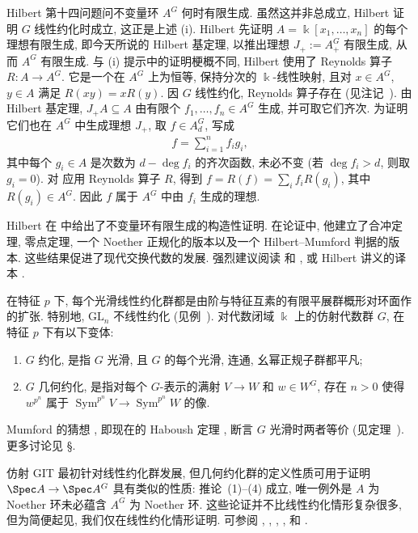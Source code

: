 \begin{remark}\label{src:7.5.2}
Hilbert 第十四问题问不变量环 $A^G$ 何时有限生成. 虽然这并非总成立, Hilbert 证明 $G$ 线性约化时成立, 这正是上述 (i). Hilbert 先证明 $A=\Bbbk[x_1,\ldots,x_n]$ 的每个理想有限生成, 即今天所说的 Hilbert 基定理, 以推出理想 $J_+:=A_+^G$ 有限生成, 从而 $A^G$ 有限生成. 与 (i) 提示中的证明梗概不同, Hilbert 使用了 Reynolds 算子 $R:A\to A^G$. 它是一个在 $A^G$ 上为恒等, 保持分次的 $\Bbbk$-线性映射, 且对 $x\in A^G$, $y\in A$ 满足 $R(xy)=xR(y)$. 因 $G$ 线性约化, Reynolds 算子存在 (见注记~). 由 Hilbert 基定理, $J_+A\subseteq A$ 由有限个 $f_1,\ldots,f_n\in A^G$ 生成, 并可取它们齐次. 为证明它们也在 $A^G$ 中生成理想 $J_+$, 取 $f\in A_d^G$, 写成
\begin{align}\label{src:7.5.3}
f=\sum_{i=1}^n f_i g_i,
\end{align}
其中每个 $g_i\in A$ 是次数为 $d-\deg f_i$ 的齐次函数, 未必不变 (若 $\deg f_i>d$, 则取 $g_i=0$). 对  应用 Reynolds 算子 $R$, 得到 $f=R(f)=\sum_i f_iR(g_i)$, 其中 $R(g_i)\in A^G$. 因此 $f$ 属于 $A^G$ 中由 $f_i$ 生成的理想.

Hilbert 在 \cite{Hil93} 中给出了不变量环有限生成的构造性证明. 在论证中, 他建立了合冲定理, 零点定理, 一个 Noether 正规化的版本以及一个 Hilbert--Mumford 判据的版本. 这些结果促进了现代交换代数的发展. 强烈建议阅读 \cite{Hil90} 和 \cite{Hil93}, 或 Hilbert 讲义的译本 \cite{Hil93}.
\end{remark}
\begin{remark}[正特征下的约化性]\label{src:7.5.4}
在特征 $p$ 下, 每个光滑线性约化群都是由阶与特征互素的有限平展群概形对环面作的扩张. 特别地, $\mathrm{GL}_n$ 不线性约化 (见例~). 对代数闭域 $\Bbbk$ 上的仿射代数群 $G$, 在特征 $p$ 下有以下变体:
\begin{enumerate}[(1)]
\item $G$ 约化, 是指 $G$ 光滑, 且 $G$ 的每个光滑, 连通, 幺幂正规子群都平凡;
\item $G$ 几何约化, 是指对每个 $G$-表示的满射 $V\to W$ 和 $w\in W^G$, 存在 $n>0$ 使得 $w^{p^n}$ 属于 $\operatorname{Sym}^{p^n}V\to\operatorname{Sym}^{p^n}W$ 的像.
\end{enumerate}
Mumford 的猜想 \cite[前言]{GIT}, 即现在的 Haboush 定理 \cite{Hab75}, 断言 $G$ 光滑时两者等价 (见定理~). 更多讨论见 \S{}.

仿射 GIT 最初针对线性约化群发展, 但几何约化群的定义性质可用于证明 $\Spec A\to\Spec A^G$ 具有类似的性质: 推论~(1)--(4) 成立, 唯一例外是 $A$ 为 Noether 环未必蕴含 $A^G$ 为 Noether 环. 这些论证并不比线性约化情形复杂很多, 但为简便起见, 我们仅在线性约化情形证明. 可参阅 \cite{Nag64}, \cite[附录 1.C]{MFK94}, \cite[\S3]{New78}, \cite[\S3.4]{Dol03}, \cite[\S2]{Spr77} 和 \cite[\S2]{DC71}.
\end{remark}

